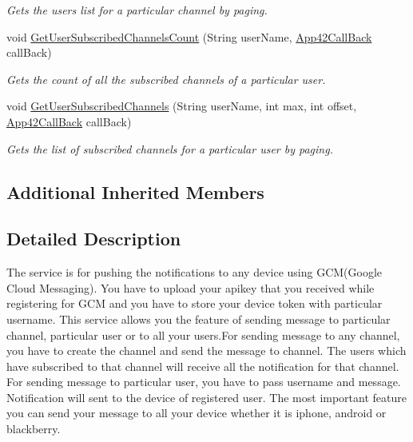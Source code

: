 \begin{DoxyCompactItemize}
\begin{DoxyCompactList}\small\item\em Gets the users list for a particular channel by paging. \end{DoxyCompactList}\item 
void \hyperlink{classcom_1_1shephertz_1_1app42_1_1paas_1_1sdk_1_1csharp_1_1push_notification_1_1_push_notification_service_adad6ac39fa7784ca4025b91a5b3add0f}{Get\+User\+Subscribed\+Channels\+Count} (String user\+Name, \hyperlink{interfacecom_1_1shephertz_1_1app42_1_1paas_1_1sdk_1_1csharp_1_1_app42_call_back}{App42\+Call\+Back} call\+Back)
\begin{DoxyCompactList}\small\item\em Gets the count of all the subscribed channels of a particular user. \end{DoxyCompactList}\item 
void \hyperlink{classcom_1_1shephertz_1_1app42_1_1paas_1_1sdk_1_1csharp_1_1push_notification_1_1_push_notification_service_aceae1b45112dae8709b3c24406462489}{Get\+User\+Subscribed\+Channels} (String user\+Name, int max, int offset, \hyperlink{interfacecom_1_1shephertz_1_1app42_1_1paas_1_1sdk_1_1csharp_1_1_app42_call_back}{App42\+Call\+Back} call\+Back)
\begin{DoxyCompactList}\small\item\em Gets the list of subscribed channels for a particular user by paging. \end{DoxyCompactList}\end{DoxyCompactItemize}
\subsection*{Additional Inherited Members}


\subsection{Detailed Description}
The service is for pushing the notifications to any device using G\+C\+M(\+Google Cloud Messaging). You have to upload your apikey that you received while registering for G\+C\+M and you have to store your device token with particular username. This service allows you the feature of sending message to particular channel, particular user or to all your users.\+For sending message to any channel, you have to create the channel and send the message to channel. The users which have subscribed to that channel will receive all the notification for that channel. For sending message to particular user, you have to pass username and message. Notification will sent to the device of registered user. The most important feature you can send your message to all your device whether it is iphone, android or blackberry. 



